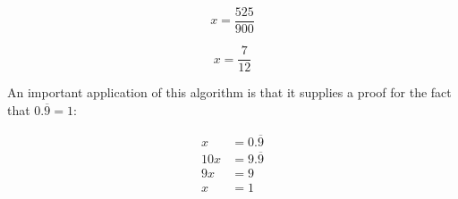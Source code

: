 \documentclass[12pt]{article}
\begin{document}
\begin{equation}
x=\frac{525}{900}
\end{equation}

\begin{equation}
x=\frac{7}{12}
\end{equation}

An important application of this algorithm is that it supplies a proof for the fact that $0.\overline{9}=1$:

\begin{align*}
x & =0.\overline{9} \\
10x & =9.\overline{9} \\
9x & =9 \\
x & =1
\end{align*}
\end{document}
